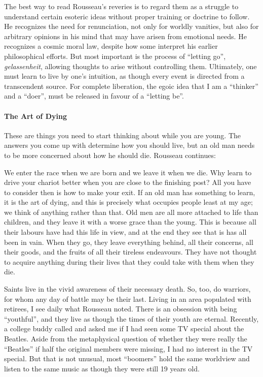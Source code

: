 The best way to read Rousseau's reveries is to regard them as a struggle to understand certain esoteric ideas without proper training or doctrine to follow. He recognizes the need for renunciation, not only for worldly vanities, but also for arbitrary opinions in his mind that may have arisen from emotional needs. He recognizes a cosmic moral law, despite how some interpret his earlier philosophical efforts. But most important is the process of ``letting go'', \emph{gelassenheit}, allowing thoughts to arise without controlling them. Ultimately, one must learn to live by one's intuition, as though every event is directed from a transcendent source. For complete liberation, the egoic idea that I am a ``thinker'' and a ``doer'', must be released in favour of a ``letting be''.

\paragraph{The Art of Dying}


These are things you need to start thinking about while you are young. The answers you come up with determine how you should live, but an old man needs to be more concerned about how he should die. Rousseau continues:

\begin{quotex}
We enter the race when we are born and we leave it when we die. Why learn to drive your chariot better when you are close to the finishing post? All you have to consider then is how to make your exit. If an old man has something to learn, it is the art of dying, and this is precisely what occupies people least at my age; we think of anything rather than that. Old men are all more attached to life than children, and they leave it with a worse grace than the young. This is because all their labours have had this life in view, and at the end they see that is has all been in vain. When they go, they leave everything behind, all their concerns, all their goods, and the fruits of all their tireless endeavours. They have not thought to acquire anything during their lives that they could take with them when they die.
\end{quotex}


Saints live in the vivid awareness of their necessary death. So, too, do warriors, for whom any day of battle may be their last. Living in an area populated with retirees, I see daily what Rousseau noted. There is an obsession with being ``youthful'', and they live as though the times of their youth are eternal. Recently, a college buddy called and asked me if I had seen some TV special about the Beatles. Aside from the metaphysical question of whether they were really the ``Beatles'' if half the original members were missing, I had no interest in the TV special. But that is not unusual, most ``boomers'' hold the same worldview and listen to the same music as though they were still 19 years old.

